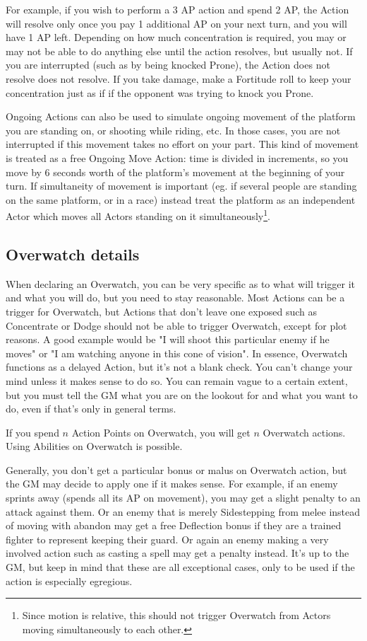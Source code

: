 For example, if you wish to perform a 3 AP action and spend 2 AP, the Action will resolve only once you pay 1 additional AP on your next turn, and you will have 1 AP left. Depending on how much concentration is required, you may or may not be able to do anything else until the action resolves, but usually not. If you are interrupted (such as by being knocked Prone), the Action does not resolve does not resolve. If you take damage, make a Fortitude roll to keep your concentration just as if if the opponent was trying to knock you Prone.

Ongoing Actions can also be used to simulate ongoing movement of the platform you are standing on, or shooting while riding, etc. In those cases, you are not interrupted if this movement takes no effort on your part. This kind of movement is treated as a free Ongoing Move Action: time is divided in increments, so you move by 6 seconds worth of the platform's movement at the beginning of your turn. If simultaneity of movement is important (eg. if several people are standing on the same platform, or in a race) instead treat the platform as an independent Actor which moves all Actors standing on it simultaneously\footnote{Since motion is relative, this should not trigger Overwatch from Actors moving simultaneously to each other.}.


\subsection{Overwatch details}

When declaring an Overwatch, you can be very specific as to what will trigger it and what you will do, but you need to stay reasonable. Most Actions can be a trigger for Overwatch, but Actions that don't leave one exposed such as Concentrate or Dodge should not be able to trigger Overwatch, except for plot reasons. A good example would be "I will shoot this particular enemy if he moves" or "I am watching anyone in this cone of vision". In essence, Overwatch functions as a delayed Action, but it's not a blank check. You can't change your mind unless it makes sense to do so. You can remain vague to a certain extent, but you must tell the GM what you are on the lookout for and what you want to do, even if that's only in general terms.

If you spend $n$ Action Points on Overwatch, you will get $n$ Overwatch actions. Using Abilities on Overwatch is possible.
    
Generally, you don't get a particular bonus or malus on Overwatch action, but the GM may decide to apply one if it makes sense. For example, if an enemy sprints away (spends all its AP on movement), you may get a slight penalty to an attack against them. Or an enemy that is merely Sidestepping from melee instead of moving with abandon may get a free Deflection bonus if they are a trained fighter to represent keeping their guard. Or again an enemy making a very involved action such as casting a spell may get a penalty instead. It's up to the GM, but keep in mind that these are all exceptional cases, only to be used if the action is especially egregious.

